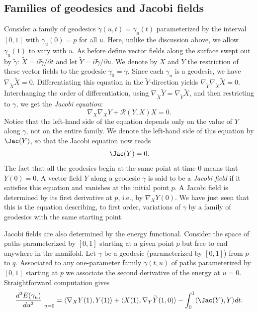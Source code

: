 \subsection{Families of geodesics and Jacobi fields}


Consider a family of geodesics $\tilde\gamma(u,t)=\gamma_u(t)$
parameterized by the interval  $[0,1]$ with $\gamma_u(0)=p$ for all
$u$. Here, unlike the discussion above, we allow $\gamma_u(1)$ to
vary with $u$. As before define vector fields along the surface
swept out by $\tilde \gamma$:  $\widetilde X=\partial
\tilde\gamma/\partial t$ and let $\tilde
Y=\partial\tilde\gamma/\partial u$.  We denote by $X$ and $Y$ the
restriction of these vector fields to the geodesic
$\gamma_0=\gamma$.
 Since each
$\gamma_u$ is a geodesic, we have $\nabla_{\widetilde X}{\widetilde
X}=0$. Differentiating this equation in the $\widetilde Y$-direction
yields $\nabla_{\widetilde Y}\nabla_{\widetilde X}\widetilde X=0$.
Interchanging the order of differentiation, using
$\nabla_{\widetilde X}\widetilde Y=\nabla_{\widetilde Y}{\widetilde
X}$, and then restricting to $\gamma$, we get the {\em Jacobi
equation}:
$$\nabla_X\nabla_XY+{\mathcal R}(Y,X)X=0.$$
Notice that the left-hand side of the equation depends only on the
value of $Y$ along $\gamma$, not on the entire family. We denote the
left-hand side of this equation by $\Jac(Y)$, so that the Jacobi
equation now reads
$$\Jac(Y)=0.$$
 The fact that all the geodesics begin at the same point at time
$0$ means that $Y(0)=0$. A vector field $Y$ along a geodesic
$\gamma$ is said to be a {\em Jacobi field} if
it satisfies this equation and vanishes at the initial point $p$. A
Jacobi field is determined by its first derivative at $p$, i.e., by
$\nabla_XY(0)$. We have just seen that this is the equation
describing, to first order, variations of $\gamma$ by a family of
geodesics with the same starting point.

Jacobi fields are also determined by the energy functional. Consider
the space of paths parameterized by $[0,1]$ starting at a given
point $p$ but free to end anywhere in the manifold. Let $\gamma$ be
a geodesic (parameterized by $[0,1]$) from $p$ to $q$. Associated to
any one-parameter family $\tilde \gamma(t,u)$ of paths parameterized
by $[0,1]$ starting at $p$ we associate the second derivative of the
energy at $u=0$. Straightforward computation gives
$$\frac{d^2E(\gamma_u)}{du^2}\Bigl|_{u=0}\Bigr.=\langle \nabla_XY(1),Y(1)\rangle+\langle
X(1),\nabla_Y\widetilde Y(1,0)\rangle-\int_0^1\langle \Jac(Y),Y\rangle dt.$$

